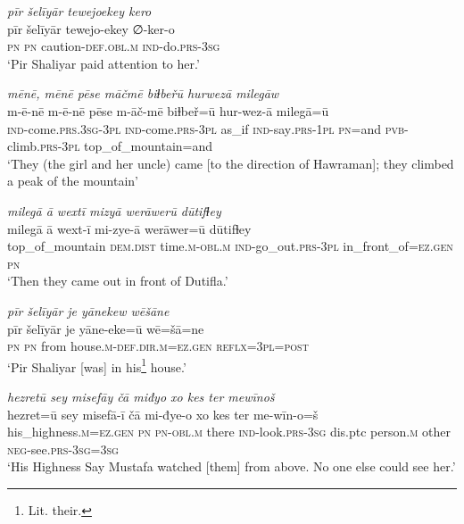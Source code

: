 \ea \label{ŽP.182}
\textit{pīr šelīyār tewejoekey kero} \\ 
\gll pīr šelīyār tewejo-ekey ∅-ker-o \\ 
 \textsc{pn} \textsc{pn} caution\textsc{-def}\textsc{.obl}\textsc{.m} \textsc{ind-}do\textsc{.prs}\textsc{-3sg} \\ 
\glt `Pir Shaliyar paid attention to her.'
\z 
 
\ea \label{ŽP.186}
\textit{mēnē, mēnē pēse māčmē biɫbeřū hurwezā milegāw} \\ 
\gll m-ē-nē m-ē-nē pēse m-āč-mē biɫbeř=ū hur-wez-ā milegā=ū \\ 
 \textsc{ind-}come\textsc{.prs}\textsc{.3sg}\textsc{-3pl} \textsc{ind-}come\textsc{.prs}\textsc{-3pl} as\_if \textsc{ind-}say\textsc{.prs}\textsc{-1pl} \textsc{pn}=and \textsc{pvb-}climb\textsc{.prs}\textsc{-3pl} top\_of\_mountain=and \\ 
\glt `They (the girl and her uncle) came [to the direction of Hawraman]; they climbed a peak of the mountain'
\z 
 
\ea \label{ŽP.187}
\textit{milegā ā wextī mizyā werāwerū dūtifɫey} \\ 
\gll milegā ā wext-ī mi-zye-ā werāwer=ū dūtifɫey \\ 
 top\_of\_mountain \textsc{dem.dist} time\textsc{.m}\textsc{-obl}\textsc{.m} \textsc{ind-}go\_out\textsc{.prs}\textsc{-3pl} in\_front\_of\textsc{\textsc{=ez.gen}} \textsc{pn} \\ 
\glt `Then they came out in front of  Dutifla.'
\z 
 
\ea \label{ŽP.188}
\textit{pīr šelīyār je yānekew wēšāne} \\ 
\gll pīr šelīyār je yāne-eke=ū wē=šā=ne \\ 
 \textsc{pn} \textsc{pn} from house\textsc{.m}\textsc{-def}\textsc{.dir}\textsc{.m}\textsc{\textsc{=ez.gen}} \textsc{reflx}\textsc{=3pl}\textsc{=\textsc{post}} \\ 
\glt `Pir Shaliyar [was] in his\footnote{Lit. their.} house.'
\z 
 
\ea \label{ŽP.189}
\textit{hezretū sey misefāy čā miđyo xo kes ter mewīnoš} \\ 
\gll hezret=ū sey misefā-ī čā mi-đye-o xo kes ter me-wīn-o=š \\ 
 his\_highness\textsc{.m}\textsc{\textsc{=ez.gen}} \textsc{pn} \textsc{pn}\textsc{-obl}\textsc{.m} there \textsc{ind-}look\textsc{.prs}\textsc{-3sg} dis.ptc person\textsc{.m} other \textsc{neg-}see\textsc{.prs}\textsc{-3sg}\textsc{=3sg} \\ 
\glt `His Highness Say Mustafa watched [them] from above. No one else could see her.'
\z 
 
